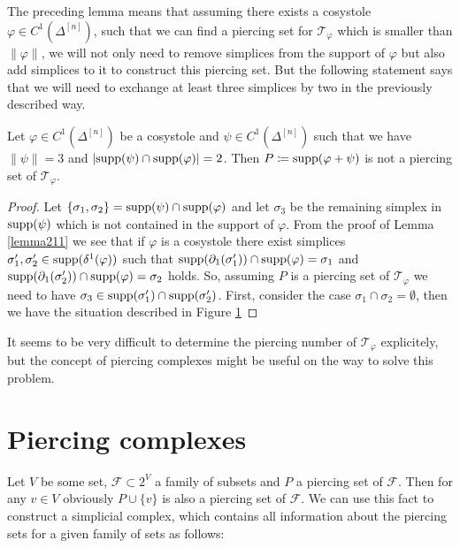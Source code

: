 The preceding lemma means that assuming there exists a cosystole \(\varphi\in C^1(\Delta^{[n]})\), such that we can find a piercing set for \(\mathcal{T}_{\varphi}\) which is smaller than \(\|\varphi\|\), we will not only need to remove simplices from the support of \(\varphi\) but also add simplices to it to construct this piercing set. But the following statement says that we will need to exchange at least three simplices by two in the previously described way.

\begin{lem}
Let \(\varphi\in C^1(\Delta^{[n]})\) be a cosystole and \(\psi\in C^1(\Delta^{[n]})\) such that we have\\
\(\|\psi\|=3\) and \(|\mathrm{supp}(\psi)\cap\mathrm{supp}(\varphi)|=2\). Then \(P\coloneqq\mathrm{supp}(\varphi + \psi)\) is not a piercing set of \(\mathcal{T}_{\varphi}\).
\begin{proof}
Let \(\{\sigma_1,\sigma_2\}=\mathrm{supp}(\psi)\cap\mathrm{supp}(\varphi)\) and let \(\sigma_3\) be the remaining simplex in \(\mathrm{supp}(\psi)\) which is not contained in the support of \(\varphi\). From the proof of Lemma \ref{lemma211} we see that if \(\varphi\) is a cosystole there exist simplices \(\sigma'_1,\sigma'_2\in \mathrm{supp}(\delta^1(\varphi))\) such that \(\mathrm{supp}(\partial_1(\sigma'_1))\cap\mathrm{supp}(\varphi)=\sigma_1\) and \(\mathrm{supp}(\partial_1(\sigma'_2))\cap\mathrm{supp}(\varphi)=\sigma_2\) holds. So, assuming \(P\) is a piercing set of \(\mathcal{T}_{\varphi}\) we need to have \(\sigma_3\in\mathrm{supp}(\sigma'_1)\cap\mathrm{supp}(\sigma'_2)\). First, consider the case \(\sigma_1\cap\sigma_2=\emptyset\), then we have the situation described in Figure \ref{} 
\end{proof}
\end{lem}

It seems to be very difficult to determine the piercing number of \(\mathcal{T}_{\varphi}\) explicitely, but the concept of piercing complexes might be useful on the way to solve this problem.

\section{Piercing complexes}

Let \(V\) be some set, \(\mathcal{F}\subset 2^V\) a family of subsets and \(P\) a piercing set of \(\mathcal{F}\). Then for any \(v\in V\) obviously \(P\cup\{v\}\) is also a piercing set of \(\mathcal{F}\). We can use this fact to construct a simplicial complex, which contains all information about the piercing sets for a given family of sets as follows:


